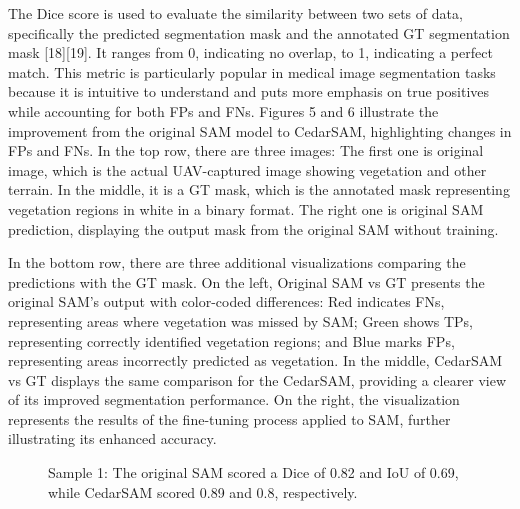 \documentclass[letterpaper, 10 pt, conference]{ieeeconf}  %
\begin{document}
The Dice score is used to evaluate the similarity between two sets of data, specifically the predicted segmentation mask and the annotated GT segmentation mask [18][19]. It ranges from 0, indicating no overlap, to 1, indicating a perfect match. This metric is particularly popular in medical image segmentation tasks because it is intuitive to understand and puts more emphasis on true positives while accounting for both FPs and FNs. Figures 5 and 6 illustrate the improvement from the original SAM model to CedarSAM, highlighting changes in FPs and FNs. In the top row, there are three images: The first one is original image, which is the actual UAV-captured image showing vegetation and other terrain. In the middle, it is a GT mask, which is the annotated mask representing vegetation regions in white in a binary format. The right one is original SAM prediction, displaying the output mask from the original SAM without training.

In the bottom row, there are three additional visualizations comparing the predictions with the GT mask. On the left, Original SAM vs GT presents the original SAM’s output with color-coded differences: Red indicates FNs, representing areas where vegetation was missed by SAM; Green shows TPs, representing correctly identified vegetation regions; and Blue marks FPs, representing areas incorrectly predicted as vegetation. In the middle, CedarSAM vs GT displays the same comparison for the CedarSAM, providing a clearer view of its improved segmentation performance. On the right, the visualization represents the results of the fine-tuning process applied to SAM, further illustrating its enhanced accuracy.

\begin{figure}[thpb]
  \centering
  \caption{Sample 1: The original SAM scored a Dice of 0.82 and IoU of 0.69, while CedarSAM scored 0.89 and 0.8, respectively.}
  \label{fig:score_distributions}
\end{figure}
\end{document}
